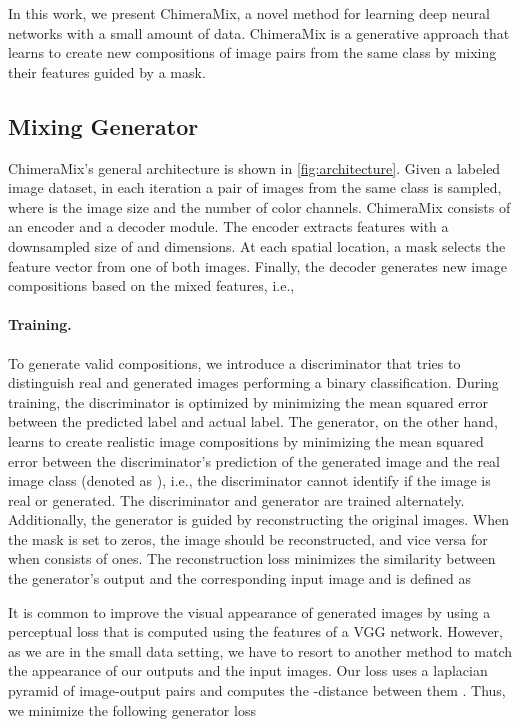 \documentclass{article}
\newcommand{\methodname}{ChimeraMix\xspace}
\begin{document}
In this work, we present \methodname, a novel method for learning deep neural networks with a small amount of data. 
\methodname is a generative approach that learns to create new compositions of image pairs from the same class by mixing their features guided by a mask.

\subsection{Mixing Generator}

\methodname's general architecture is shown in \cref{fig:architecture}.
Given a labeled image dataset, in each iteration a pair of images  from the same class is sampled, where  is the image size and  the number of color channels.
\methodname consists of an encoder and a decoder module.
The encoder  extracts features  with a downsampled size of  and  dimensions. 
At each spatial location, a mask  selects the feature vector from one of both images.
Finally, the decoder  generates new image compositions  based on the mixed features, i.e.,



\paragraph{Training.}

To generate valid compositions, we introduce a discriminator  that tries to distinguish real and generated images performing a binary classification.
During training, the discriminator is optimized by minimizing the mean squared error  between the predicted label and actual label.
The generator, on the other hand, learns to create realistic image compositions by minimizing the mean squared error between the discriminator's prediction of the generated image and the real image class (denoted as ), i.e., the discriminator cannot identify if the image is real or generated. 
The discriminator and generator are trained alternately.
Additionally, the generator is guided by reconstructing the original images. 
When the mask  is set to zeros, the image  should be reconstructed, and vice versa for  when  consists of ones. 
The reconstruction loss minimizes the similarity between the generator's output and the corresponding input image and is defined as 

It is common to improve the visual appearance of generated images by using a perceptual loss that is computed using the features of a VGG \cite{simonyanVeryDeepConvolutional2015} network.
However, as we are in the small data setting, we have to resort to another method to match the appearance of our outputs and the input images.
Our loss  uses a laplacian pyramid of image-output pairs and computes the -distance between them \cite{dentonDeepGenerativeImage2015}.
Thus, we minimize the following generator loss 
\end{document}
